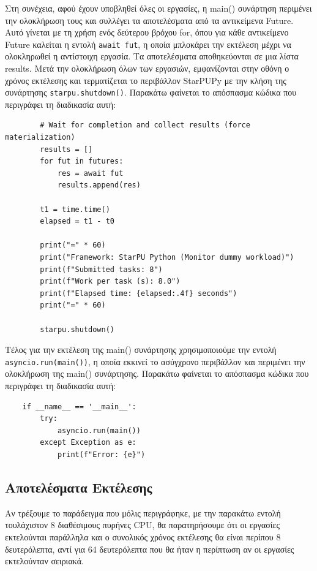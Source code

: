 Στη συνέχεια, αφού έχουν υποβληθεί όλες οι εργασίες, η main() συνάρτηση περιμένει την ολοκλήρωση τους και συλλέγει τα αποτελέσματα από τα αντικείμενα Future. Αυτό γίνεται με τη χρήση ενός δεύτερου βρόχου for, όπου για κάθε αντικείμενο Future καλείται η εντολή \texttt{await fut}, η οποία μπλοκάρει την εκτέλεση μέχρι να ολοκληρωθεί η αντίστοιχη εργασία. Τα αποτελέσματα αποθηκεύονται σε μια λίστα results. Μετά την ολοκλήρωση όλων των εργασιών, εμφανίζονται στην οθόνη ο χρόνος εκτέλεσης και τερματίζεται το περιβάλλον StarPUPy με την κλήση της συνάρτησης \texttt{starpu.shutdown()}. Παρακάτω φαίνεται το απόσπασμα κώδικα που περιγράφει τη διαδικασία αυτή:

\begin{verbatim}
        # Wait for completion and collect results (force materialization)
        results = []
        for fut in futures:
            res = await fut
            results.append(res)

        t1 = time.time()
        elapsed = t1 - t0

        print("=" * 60)
        print("Framework: StarPU Python (Monitor dummy workload)")
        print(f"Submitted tasks: 8")
        print(f"Work per task (s): 8.0")
        print(f"Elapsed time: {elapsed:.4f} seconds")
        print("=" * 60)

        starpu.shutdown()
\end{verbatim}

Τέλος για την εκτέλεση της main() συνάρτησης χρησιμοποιούμε την εντολή \texttt{asyncio\linebreak.run(main())}, η οποία εκκινεί το ασύγχρονο περιβάλλον και περιμένει την ολοκλήρωση της main() συνάρτησης. Παρακάτω φαίνεται το απόσπασμα κώδικα που περιγράφει τη διαδικασία αυτή:

\begin{verbatim}
    if __name__ == '__main__':
        try:
            asyncio.run(main())
        except Exception as e:
            print(f"Error: {e}")
\end{verbatim}

\subsection{Αποτελέσματα Εκτέλεσης}

Αν τρέξουμε το παράδειγμα που μόλις περιγράφηκε, με την παρακάτω εντολή τουλάχιστον 8 διαθέσιμους πυρήνες CPU, θα παρατηρήσουμε ότι οι εργασίες εκτελούνται παράλληλα και ο συνολικός χρόνος εκτέλεσης θα είναι περίπου 8 δευτερόλεπτα, αντί για 64 δευτερόλεπτα που θα ήταν η περίπτωση αν οι εργασίες εκτελούνταν σειριακά.

